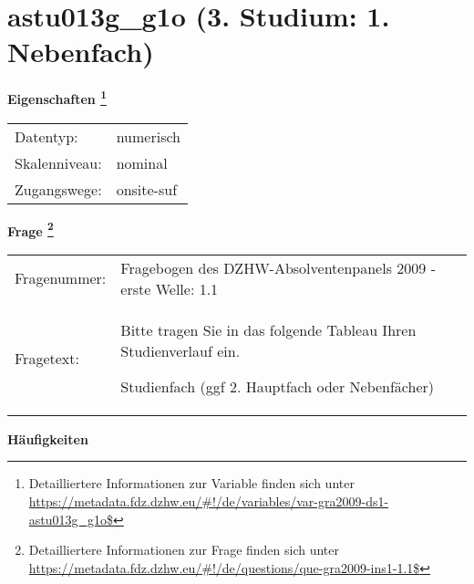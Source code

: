 
    \setcounter{footnote}{0}

    \vspace*{-1.8cm}
	\section{astu013g\_g1o (3. Studium: 1. Nebenfach)}
	\label{section:astu013g_g1o}



    \vspace*{0.5cm}
    \noindent\textbf{Eigenschaften
	\footnote{Detailliertere Informationen zur Variable finden sich unter
		\url{https://metadata.fdz.dzhw.eu/\#!/de/variables/var-gra2009-ds1-astu013g_g1o$}}}\\
	\begin{tabularx}{\hsize}{@{}lX}
	Datentyp: & numerisch \\
	Skalenniveau: & nominal \\
	Zugangswege: &
	  onsite-suf
 \\
    \end{tabularx}



				\vspace*{0.5cm}
                \noindent\textbf{Frage
	                \footnote{Detailliertere Informationen zur Frage finden sich unter
		              \url{https://metadata.fdz.dzhw.eu/\#!/de/questions/que-gra2009-ins1-1.1$}}}\\
				\begin{tabularx}{\hsize}{@{}lX}
					Fragenummer: &
					  Fragebogen des DZHW-Absolventenpanels 2009 - erste Welle:
					  1.1
 \\
					Fragetext: & Bitte tragen Sie in das folgende Tableau Ihren Studienverlauf ein.\par  Studienfach (ggf 2. Hauptfach oder Nebenfächer) \\
				\end{tabularx}





        		\vspace*{0.5cm}
                \noindent\textbf{Häufigkeiten}

